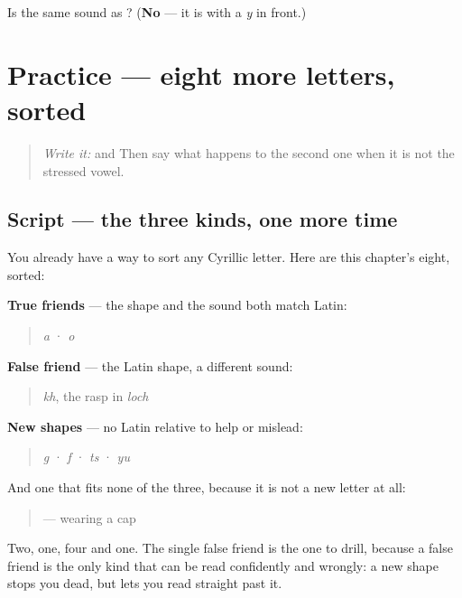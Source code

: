 \begin{tcolorbox}[breakable,colback=teal!4,colframe=teal!35!black,title={Before you move on}]
Is  the same sound as ? (\textbf{No} — it is  with a \emph{y} in front.)
\end{tcolorbox}
\section[Practice]{Practice — eight more letters, sorted}

\label{lesson:RU-C15-practice}



\begin{quote}
\emph{Write it:}  and  Then say what happens to the second one when it is not the stressed vowel.
\end{quote}

\subsection*{Script — the three kinds, one more time}
You already have a way to sort any Cyrillic letter. Here are this chapter's eight, sorted:

\textbf{True friends} — the shape and the sound both match Latin:

\begin{quote}
\textbf{} \emph{a} · \textbf{} \emph{o}
\end{quote}

\textbf{False friend} — the Latin shape, a different sound:

\begin{quote}
\textbf{} \emph{kh}, the rasp in \emph{loch}
\end{quote}

\textbf{New shapes} — no Latin relative to help or mislead:

\begin{quote}
\textbf{} \emph{g} · \textbf{} \emph{f} · \textbf{} \emph{ts} · \textbf{} \emph{yu}
\end{quote}

And one that fits none of the three, because it is not a new letter at all:

\begin{quote}
\textbf{} —  wearing a cap
\end{quote}

Two, one, four and one. The single false friend is the one to drill, because a false friend is the only kind that can be read confidently and wrongly: a new shape stops you dead, but  lets you read straight past it.

